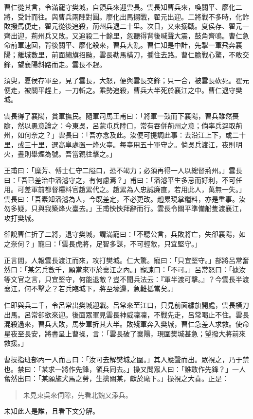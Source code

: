曹仁從其言，令滿寵守樊城，自領兵來迎雲長。雲長知曹兵來，喚關平、廖化二將，受計而往。與曹兵兩陣對圓。廖化出馬搦戰，翟元出迎。二將戰不多時，化詐敗撥馬便走，翟元從後追殺，荊州兵退二十里。次日，又來搦戰。夏侯存、翟元一齊出迎，荊州兵又敗。又追殺二十餘里，忽聽得背後喊聲大震，鼓角齊鳴。曹仁急命前軍速回，背後關平、廖化殺來，曹兵大亂。曹仁知是中計，先掣一軍飛奔襄陽；離城數里，前面繡旗招颭，雲長勒馬橫刀，攔住去路。曹仁膽戰心驚，不敢交鋒，望襄陽斜路而走。雲長不趕。

須臾，夏侯存軍至，見了雲長，大怒，便與雲長交鋒；只一合，被雲長砍死。翟元便走，被關平趕上，一刀斬之。乘勢追殺，曹兵大半死於襄江之中。曹仁退守樊城。

雲長得了襄陽，賞軍撫民。隨軍司馬王甫曰：「將軍一鼓而下襄陽，曹兵雖然喪膽，然以愚意論之：今東吳，呂蒙屯兵陸口，常有吞併荊州之意；倘率兵逕取荊州，如何奈之？」雲長曰：「吾亦念及此。汝便可提調此事：去沿江上下，或二十里，或三十里，選高阜處置一烽火臺。每臺用五十軍守之。倘吳兵渡江，夜則明火，晝則舉煙為號。吾當親往擊之。」

王甫曰：「糜芳、傅士仁守二隘口，恐不竭力；必須再得一人以總督荊州。」雲長曰：「吾已差治中潘濬守之，有何慮焉？」甫曰：「潘濬平生多忌而好利，不可任用。可差軍前都督糧料官趙累代之。趙累為人忠誠廉直，若用此人，萬無一失。」雲長曰：「吾素知潘濬為人，今既差定，不必更改。趙累現掌糧料，亦是重事。汝勿多疑，只與我築烽火臺去。」王甫怏怏拜辭而行。雲長令關平準備船隻渡襄江，攻打樊城。

卻說曹仁折了二將，退守樊城，謂滿寵曰：「不聽公言，兵敗將亡，失卻襄陽，如之奈何？」寵曰：「雲長虎將，足智多謀，不可輕敵，只宜堅守。」

正言間，人報雲長渡江而來，攻打樊城。仁大驚。寵曰：「只宜堅守。」部將呂常奮然曰：「某乞兵數千，願當來軍於襄江之內。」寵諫曰：「不可。」呂常怒曰：「據汝等文官之言，只宜堅守，何能退敵？豈不聞兵法云：『軍半渡可擊。』？今雲長半渡襄江，何不擊之？若兵臨城下，將至壕邊，急難抵當矣。」

仁即與兵二千，令呂常出樊城迎戰。呂常來至江口，只見前面繡旗開處，雲長橫刀出馬。呂常卻欲來迎。後面眾軍見雲長神威凜凜，不戰先走，呂常喝止不住。雲長混殺過來，曹兵大敗，馬步軍折其大半。敗殘軍奔入樊城，曹仁急差人求救。使命星夜至長安，將書呈上曹操，言：「雲長破了襄陽，現圍樊城甚急；望撥大將前來救援。」

曹操指班部內一人而言曰：「汝可去解樊城之圍。」其人應聲而出。眾視之，乃于禁也。禁曰：「某求一將作先鋒，領兵同去。」操又問眾人曰：「誰敢作先鋒？」一人奮然出曰：「某願施犬馬之勞，生擒關某，獻於麾下。」操視之大喜。正是：

\begin{quote}
未見東吳來伺隙，先看北魏又添兵。
\end{quote}

未知此人是誰，且看下文分解。
